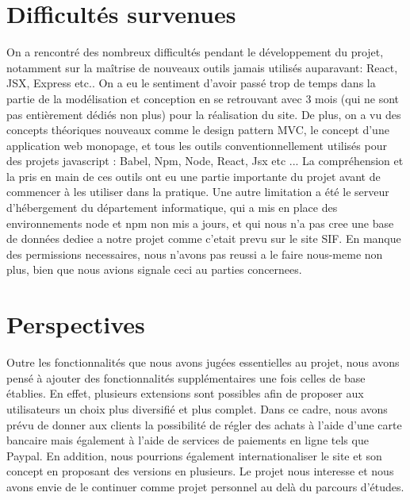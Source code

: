 \documentclass[a4paper,12pt]{report}
\theoremstyle{break}
\theoremstyle{break}
\theoremstyle{break}
\theoremstyle{break}
\theoremstyle{definition}
\theoremstyle{remark}
\begin{document}
\section{Difficultés survenues}
On a rencontré des nombreux difficultés pendant le développement du projet, notamment sur la maîtrise de
nouveaux outils jamais utilisés auparavant: React, JSX, Express etc..
On a eu le sentiment d'avoir passé trop de temps dans la partie de la modélisation et conception en se retrouvant
avec 3 mois (qui ne sont pas entièrement dédiés non plus) pour la réalisation du site.
De plus, on a vu des concepts théoriques nouveaux comme le design pattern MVC, le concept d'une application web monopage,
et tous les outils conventionnellement utilisés pour des projets javascript : Babel, Npm, Node, React, Jsx etc ...
La compréhension et la pris en main de ces outils ont eu une partie importante du projet avant de commencer à les utiliser dans la pratique.
Une autre limitation a été le serveur d'hébergement du département informatique, qui a mis en place des environnements node et npm non mis a jours,
et qui nous n’a pas cree une base de données  dediee a notre projet comme c’etait prevu sur le site SIF. En manque des permissions necessaires, nous n’avons pas reussi a le faire nous-meme non plus, bien que nous avions signale ceci au parties concernees.


\section{Perspectives}
\label{sec:perspectives}
Outre les fonctionnalités que nous avons jugées essentielles au projet, nous avons pensé à ajouter
des fonctionnalités supplémentaires une fois celles de base établies. En effet, plusieurs extensions
sont possibles afin de proposer aux utilisateurs un choix plus diversifié et plus complet.
Dans ce cadre, nous avons prévu de donner aux clients la possibilité de régler des achats à l'aide
d'une carte bancaire mais également à l'aide de services de paiements en ligne tels que Paypal.
En addition, nous pourrions également internationaliser le site et son concept en proposant des versions
en plusieurs.
Le projet nous interesse et nous avons envie de le continuer comme projet personnel au delà du parcours d'études.
\end{document}
